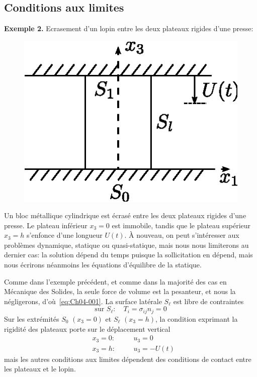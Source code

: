 \subsection{Conditions aux limites} \label{ssec:Ch04-1.2}
\textbf{Exemple 2.} Ecrasement d'un lopin entre les deux plateaux rigides d'une presse:

\begin{figure}
    \begin{center}
        \includegraphics{../images/T1_Ch04-0002}
    \end{center}
\end{figure}
Un bloc métallique cylindrique est écrasé entre les deux plateaux rigides d'une presse.
Le plateau inférieur $x_3 =0$ est immobile, tandis que le plateau supérieur $x_3 =h$ s'enfonce d'une longueur $U(t)$.
À nouveau, on peut s'intéresser aux problèmes dynamique, statique ou quasi-statique, mais nous nous limiterons au dernier cas: la solution dépend du temps puisque la sollicitation en dépend, mais nous écrirons néanmoins les équations d'équilibre de la statique.

Comme dans l'exemple précédent, et comme dans la majorité des cas en Mécanique des Solides, la seule force de volume est la pesanteur, et nous la négligerons, d'où~\eqref{eq:Ch04-001}.
La surface latérale $S_\ell$ est libre de contraintes
\begin{equation}
    \text{sur } S_\ell:\quad T_i = \sigma_{ij} n_j = 0
    \label{eq:Ch04-008}
\end{equation}
Sur les extrémités $S_0$ $(x_3=0)$ et $S_\ell$ $(x_3=h)$, la condition exprimant la rigidité des plateaux porte sur le déplacement vertical
\begin{equation}
    \begin{aligned}
        & x_3=0:\quad&& u_3 = 0 \\
        & x_3=h: && u_3 = -U(t)
    \end{aligned}
    \label{eq:Ch04-009}
\end{equation}
mais les autres conditions aux limites dépendent des conditions de contact entre les plateaux et le lopin.


